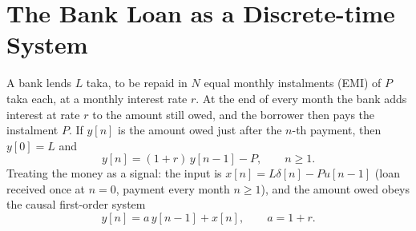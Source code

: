 \renewcommand{\teacherTag}{QUESTION 3 \textbullet\ 35 MARKS}
\chapter{The Bank Loan as a Discrete-time System}

\begin{scenario}
A bank lends $L$ taka, to be repaid in $N$ equal monthly instalments (EMI) of $P$ taka each, at a monthly interest rate $r$. At the end of every month the bank adds interest at rate $r$ to the amount still owed, and the borrower then pays the instalment $P$. If $y[n]$ is the amount owed just after the $n$-th payment, then $y[0]=L$ and
\[y[n]=(1+r)\,y[n-1]-P,\qquad n\ge1 .\]
Treating the money as a signal: the input is $x[n]=L\delta[n]-Pu[n-1]$ (loan received once at $n=0$, payment every month $n\ge1$), and the amount owed obeys the causal first-order system
\[y[n]=a\,y[n-1]+x[n],\qquad a=1+r .\]
\end{scenario}

\begin{center}
\end{center}

